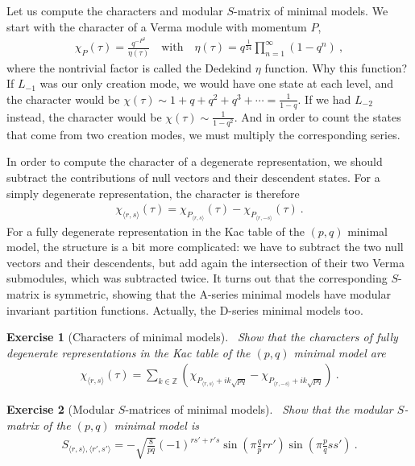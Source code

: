 \documentclass[12pt, a4paper]{article}
\theoremstyle{break}
\newtheorem{exo}{Exercise}[section]
\begin{document}
Let us compute the characters and modular $S$-matrix of minimal models. We start with the character of a Verma module with momentum $P$,
\begin{align}
 \chi_P(\tau) = \frac{q^{-P^2}}{\eta(\tau)} \quad \text{with} \quad \eta(\tau) = q^{\frac{1}{24}} \prod_{n=1}^\infty (1-q^n)\ ,
\end{align}
where the nontrivial factor is called the Dedekind $\eta$ function. Why this function? If $L_{-1}$ was our only creation mode, we would have one state at each level, and the character would be $\chi(\tau)\sim 1+q+q^2+q^3+\cdots = \frac{1}{1-q}$. If we had $L_{-2}$ instead, the character would be $\chi(\tau)\sim \frac{1}{1-q^2}$. And in order to count the states that come from two creation modes, we must multiply the corresponding series.

In order to compute the character of a degenerate representation, we should subtract the contributions of null vectors and their descendent states. For a simply degenerate representation, the character is therefore
\begin{align}
 \chi_{\langle r,s\rangle}(\tau) = \chi_{P_{\langle r,s\rangle}}(\tau) - \chi_{P_{\langle r,-s\rangle}}(\tau)\ .
\end{align}
For a fully degenerate representation in the Kac table of the $(p, q)$ minimal model, the structure is a bit more complicated: we have to subtract the two null vectors and their descendents, but add again the intersection of their two Verma submodules, which was subtracted twice.
It turns out that 
the corresponding $S$-matrix is symmetric, showing that the A-series minimal models have modular invariant partition functions. Actually, the D-series minimal models too. 

\begin{exo}[Characters of minimal models]
 ~\label{exo:chmm}
 Show that the characters of fully degenerate representations in the Kac table of the $(p, q)$ minimal model are
 \begin{align}
 \chi_{\langle r,s\rangle}(\tau) = \sum_{k\in\mathbb{Z}} \left( \chi_{P_{\langle r,s\rangle} + ik\sqrt{pq}} - \chi_{P_{\langle r,-s\rangle} + ik\sqrt{pq}}\right)\ .
 \label{eq:chmm}
\end{align}
\end{exo}

\begin{exo}[Modular $S$-matrices of minimal models]
~\label{exo:mods}
 Show that the modular $S$-matrix of the $(p, q)$ minimal model is 
 \begin{align}
 S_{\langle r,s\rangle, \langle r', s'\rangle} = -\sqrt{\frac{8}{pq}}(-1)^{rs'+r's} \sin\left(\pi\frac{q}{p}rr'\right)\sin\left(\pi\frac{p}{q}ss'\right)\ .
 \label{eq:smm}
\end{align}
\end{exo}
\end{document}
